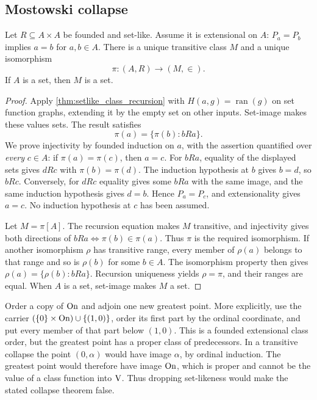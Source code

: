 \subsection{Mostowski collapse}
\begin{theorem}
\label{thm:mostowski_collapse}
Let $R\subseteq A\times A$ be founded and set-like. Assume it is
extensional on $A$: $P_a=P_b$ implies $a=b$ for $a,b\in A$.
There is a unique transitive class $M$ and a unique isomorphism
\[
\pi:(A,R)\longrightarrow(M,\in).
\]
If $A$ is a set, then $M$ is a set.
\end{theorem}
\begin{proof}
Apply \ref{thm:setlike_class_recursion} with
$H(a,g)=\operatorname{ran}(g)$ on set function graphs, extending it by
the empty set on other inputs. Set-image makes these values sets.
The result satisfies
\[
\pi(a)=\{\pi(b):bRa\}.
\]
We prove injectivity by founded induction on $a$, with the assertion
quantified over \emph{every} $c\in A$: if $\pi(a)=\pi(c)$, then $a=c$.
For $bRa$, equality of the displayed sets gives $dRc$ with
$\pi(b)=\pi(d)$. The induction hypothesis at $b$ gives $b=d$, so
$bRc$. Conversely, for $dRc$ equality gives some $bRa$ with the same
image, and the same induction hypothesis gives $d=b$. Hence
$P_a=P_c$, and extensionality gives $a=c$. No induction hypothesis at
$c$ has been assumed.

Let $M=\pi[A]$. The recursion equation makes $M$ transitive, and
injectivity gives both directions of
$bRa\iff\pi(b)\in\pi(a)$. Thus $\pi$ is the required isomorphism.
If another isomorphism $\rho$ has transitive range, every member of
$\rho(a)$ belongs to that range and so is $\rho(b)$ for some $b\in A$.
The isomorphism property then gives
$\rho(a)=\{\rho(b):bRa\}$. Recursion uniqueness yields $\rho=\pi$,
and their ranges are equal. When $A$ is a set, set-image makes $M$ a set.
\end{proof}

\begin{example}
Order a copy of $\mathrm{On}$ and adjoin one new greatest point. More explicitly,
use the carrier $(\{0\}\times\mathrm{On})\cup\{(1,0)\}$, order its first
part by the ordinal coordinate, and put every member of that part below
$(1,0)$. This is a founded extensional class order, but the greatest
point has a proper class of predecessors. In a transitive collapse the
point $(0,\alpha)$ would have image $\alpha$, by ordinal induction.
The greatest point would therefore have image $\mathrm{On}$, which is proper
and cannot be the value of a class function into $\mathrm{V}$. Thus dropping
set-likeness would make the stated collapse theorem false.
\end{example}

